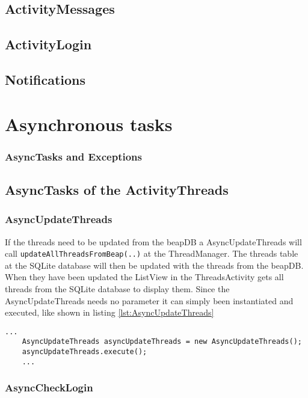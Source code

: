 \documentclass[12pt,a4paper,oneside]{report}
\newcommand{\code}[1]{\lstinline{#1}}
\begin{document}
\subsection{ActivityMessages}

\subsection{ActivityLogin}

\subsection{Notifications}

\section{Asynchronous tasks}
\subsubsection{AsyncTasks and Exceptions}

\subsection{AsyncTasks of the ActivityThreads}

\subsubsection{AsyncUpdateThreads}
\label{AsyncUpdateThreads}

If the threads need to be updated from the beapDB a AsyncUpdateThreads will call \code{updateAllThreadsFromBeap(..)} at the ThreadManager. The threads table at the SQLite database will then be updated with the threads from the beapDB. When they have been updated the ListView in the ThreadsActivity gets all threads from the SQLite database to display them.
Since the AsyncUpdateThreads needs no parameter it can simply been instantiated and executed, like shown in listing \ref{lst:AsyncUpdateThreads}

\begin{lstlisting}[caption=AsyncUpdateThreads, label=lst:AsyncUpdateThreads]
	...
	AsyncUpdateThreads asyncUpdateThreads = new AsyncUpdateThreads();
	asyncUpdateThreads.execute();
	...
\end{lstlisting}

\subsubsection{AsyncCheckLogin}
\label{AsyncCheckLogin}
\end{document}
